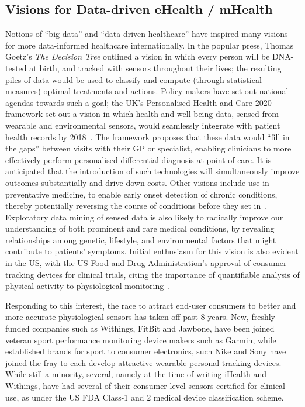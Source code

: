 \documentclass{sigchi}
\begin{document}
\subsection{Visions for Data-driven eHealth / mHealth}
Notions of ``big data'' and ``data driven healthcare'' have inspired many visions  for more data-informed healthcare internationally. In the popular press, Thomas Goetz's \emph{The Decision Tree} outlined a vision in which every person will be DNA-tested at birth, and tracked with sensors throughout their lives; the resulting piles of data would be used to classify and compute (through statistical measures) optimal treatments and actions. Policy makers have set out national agendas towards such a goal; the UK's Personalised Health and Care 2020 framework set out a vision in which health and well-being data, sensed from wearable and environmental sensors, would seamlessly integrate with patient health records by 2018~\cite{Personalised2014}.  The framework proposes that these data would ``fill in the gaps'' between visits with their GP or specialist, enabling clinicians to more effectively perform personalised differential diagnosis at point of care.  It is anticipated that the introduction of such technologies will simultaneously improve outcomes substantially and drive down costs.  Other visions include use in preventative medicine, to enable early onset detection of chronic conditions, thereby potentially reversing the course of conditions before they set in~\cite{Swan2009}.  Exploratory data mining of sensed data is also likely to radically improve our understanding of both prominent and rare medical conditions, by revealing relationships among genetic, lifestyle, and environmental factors that might contribute to patients' symptoms.  Initial enthusiasm for this vision is also evident in the US, with the US Food and Drug Administration's approval of  consumer tracking devices for clinical trials, citing the importance of quantifiable analysis of physical activity to physiological monitoring~\cite{U.S.FoodandDrugAdministration2014}.



Responding to this interest, the race to attract end-user consumers to better and more accurate physiological sensors has taken off past 8 years. New, freshly funded companies such as Withings, FitBit and Jawbone, have been joined veteran sport performance monitoring device makers such as Garmin, while established brands for sport to consumer electronics, such Nike and Sony have joined the fray to each develop attractive wearable personal tracking devices.  While still a minority, several, namely at the time of writing iHealth and Withings, have had several of their consumer-level sensors certified for clinical use, as under the US FDA Class-1 and 2 medical device classification scheme. 
\end{document}
